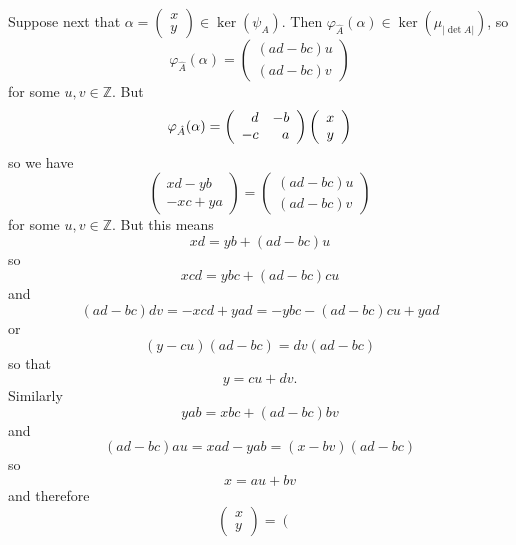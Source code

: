 \documentclass{article}
\begin{document}
\begin{Answer}
\begin{enumerate}[(a)]
{\begin{itemize}
{        Suppose next that
        $\alpha =
         \left(\begin{array}{c}
           x \\
           y
         \end{array}\right)
         \in \ker(\psi_A)$. Then $\varphi_{\hat{A}}(\alpha) \in \ker(\mu_{|\det A|})$, so
         $$
         \varphi_{\hat{A}}(\alpha) =
         \left(\begin{array}{c}
           (ad - bc)u \\
           (ad - bc)v
         \end{array}\right)
         $$
         for some $u, v \in \mathbb{Z}$. But
         $$
         \varphi_{\hat{A}}(\alpha) =
         \left(\begin{array}{r r}
            d & -b \\
           -c &  a
         \end{array}\right)
         \left(\begin{array}{c}
           x \\
           y
         \end{array}\right)
         $$
         so we have
         $$
         \left(\begin{array}{r}
           xd - yb \\
          -xc + ya
         \end{array}\right) =
         \left(\begin{array}{c}
           (ad - bc)u \\
           (ad - bc)v
         \end{array}\right)
         $$
         for some $u, v \in \mathbb{Z}$. But this means
         $$
         xd = yb + (ad - bc)u
         $$
         so
         $$
         xcd = ybc + (ad - bc)cu
         $$
         and
         $$
         (ad - bc)dv =
           -xcd + yad =
           -ybc - (ad - bc)cu + yad
         $$
         or
         $$
         (y - cu)(ad - bc) = dv(ad - bc)
         $$
         so that
         $$
         y = cu + dv.
         $$
         Similarly
         $$
         yab = xbc + (ad - bc)bv
         $$
         and
         $$
         (ad - bc)au =
           xad - yab =
           (x - bv)(ad - bc)
         $$
         so
         $$
         x = au + bv
         $$
         and therefore
         $$
         \left(\begin{array}{c}
           x \\
           y
         \end{array}\right) =
         \left(\begin{array}{c}

\end{array}$$}
\end{itemize}}
\end{enumerate}
\end{Answer}
\end{document}
